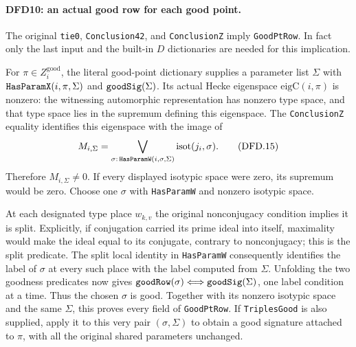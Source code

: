 \paragraph{DFD10: an actual good row for each good point.}
\label{claim:DFD10}
The original \texttt{tie0}, \texttt{Conclusion42}, and
\texttt{Conclusion\allowbreak Z} imply \texttt{Good\allowbreak Pt\allowbreak Row}. In fact
only the last input and the built-in $D$ dictionaries are
needed for this implication.

For $\pi\in Z_i^{\mathrm{good}}$, the literal good-point
dictionary supplies a parameter list $\Sigma$ with
$\texttt{Has\allowbreak Param\allowbreak X}(i,\pi,\Sigma)$ and
$\texttt{good\allowbreak Sig}(\Sigma)$. Its actual Hecke eigenspace
$\mathrm{eigC}(i,\pi)$ is nonzero: the witnessing
automorphic representation has nonzero type space, and that
type space lies in the supremum defining this eigenspace.
The \texttt{Conclusion\allowbreak Z} equality identifies this eigenspace
with the image of
\[
 M_{i,\Sigma}
    =\bigvee_{\sigma:\,\texttt{Has\allowbreak Param\allowbreak W}(i,\sigma,\Sigma)}
                      \mathrm{isot}(j_i,\sigma).         \tag{DFD.15}
\]
Therefore $M_{i,\Sigma}\ne0$. If every displayed isotypic
space were zero, its supremum would be zero. Choose one
$\sigma$ with \texttt{Has\allowbreak Param\allowbreak W} and nonzero isotypic space.

At each designated type place $w_{k,v}$ the original
nonconjugacy condition implies it is split. Explicitly, if
conjugation carried its prime ideal into itself, maximality
would make the ideal equal to its conjugate, contrary to
nonconjugacy; this is the split predicate. The split local
identity in \texttt{Has\allowbreak Param\allowbreak W} consequently identifies the
label of $\sigma$ at every such place with the label computed
from $\Sigma$. Unfolding the two goodness predicates now
gives
$\texttt{good\allowbreak Row}(\sigma)\Longleftrightarrow
\texttt{good\allowbreak Sig}(\Sigma)$, one label condition at a time.
Thus the chosen $\sigma$ is good. Together with its nonzero
isotypic space and the same $\Sigma$, this proves every field
of \texttt{Good\allowbreak Pt\allowbreak Row}. If \texttt{Triples\allowbreak Good} is also
supplied, apply it to this very pair $(\sigma,\Sigma)$ to
obtain a good signature attached to $\pi$, with all the
original shared parameters unchanged.

